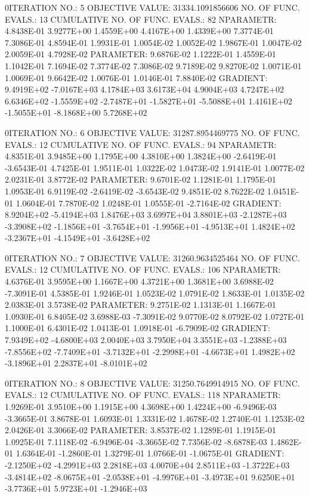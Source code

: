\documentclass[
  letterpaper,
  toc=chapterentrywithdots,
  listof=totoc,
  11pt,
  headings=small,
  usegeometry]{scrreprt}
\begin{document}
\begin{nonmemlisting}
0ITERATION NO.:    5    OBJECTIVE VALUE:   31334.1091856606        NO. OF FUNC. EVALS.:  13
 CUMULATIVE NO. OF FUNC. EVALS.:       82
 NPARAMETR:  4.8438E-01  3.9277E+00  1.4559E+00  4.4167E+00  1.4339E+00  7.3774E-01  7.3086E-01  4.8594E-01  1.9931E-01  1.0054E-02
             1.0052E-02  1.9867E-01  1.0047E-02  2.0059E-01  4.7928E-02
 PARAMETER:  9.6876E-02  1.1222E-01  1.4559E-01  1.1042E-01  7.1694E-02  7.3774E-02  7.3086E-02  9.7189E-02  9.8270E-02  1.0071E-01
             1.0069E-01  9.6642E-02  1.0076E-01  1.0146E-01  7.8840E-02
 GRADIENT:   9.4919E+02 -7.0167E+03  4.1784E+03  3.6173E+04  4.9004E+03  4.7247E+02  6.6346E+02 -1.5559E+02 -2.7487E+01 -1.5827E+01
            -5.5088E+01  1.4161E+02 -1.5055E+01 -8.1868E+00  5.7268E+02

0ITERATION NO.:    6    OBJECTIVE VALUE:   31287.8954469775        NO. OF FUNC. EVALS.:  12
 CUMULATIVE NO. OF FUNC. EVALS.:       94
 NPARAMETR:  4.8351E-01  3.9485E+00  1.1795E+00  4.3810E+00  1.3824E+00 -2.6419E-01 -3.6543E-01  4.7425E-01  1.9511E-01  1.0322E-02
             1.0473E-02  1.9141E-01  1.0077E-02  2.0231E-01  3.8772E-02
 PARAMETER:  9.6701E-02  1.1281E-01  1.1795E-01  1.0953E-01  6.9119E-02 -2.6419E-02 -3.6543E-02  9.4851E-02  8.7622E-02  1.0451E-01
             1.0604E-01  7.7870E-02  1.0248E-01  1.0555E-01 -2.7164E-02
 GRADIENT:   8.9204E+02 -5.4194E+03  1.8476E+03  3.6997E+04  3.8801E+03 -2.1287E+03 -3.3908E+02 -1.1856E+01 -3.7654E+01 -1.9956E+01
            -4.9513E+01  1.4824E+02 -3.2367E+01 -4.1549E+01 -3.6428E+02

0ITERATION NO.:    7    OBJECTIVE VALUE:   31260.9634525464        NO. OF FUNC. EVALS.:  12
 CUMULATIVE NO. OF FUNC. EVALS.:      106
 NPARAMETR:  4.6376E-01  3.9595E+00  1.1667E+00  4.3721E+00  1.3681E+00  3.6988E-02 -7.3091E-01  4.5385E-01  1.9246E-01  1.0523E-02
             1.0791E-02  1.8633E-01  1.0135E-02  2.0383E-01  3.5738E-02
 PARAMETER:  9.2751E-02  1.1313E-01  1.1667E-01  1.0930E-01  6.8405E-02  3.6988E-03 -7.3091E-02  9.0770E-02  8.0792E-02  1.0727E-01
             1.1000E-01  6.4301E-02  1.0413E-01  1.0918E-01 -6.7909E-02
 GRADIENT:   7.9349E+02 -4.6800E+03  2.0040E+03  3.7950E+04  3.3551E+03 -1.2388E+03 -7.8556E+02 -7.7409E+01 -3.7132E+01 -2.2998E+01
            -4.6673E+01  1.4982E+02 -3.1896E+01  2.2837E+01 -8.0101E+02

0ITERATION NO.:    8    OBJECTIVE VALUE:   31250.7649914915        NO. OF FUNC. EVALS.:  12
 CUMULATIVE NO. OF FUNC. EVALS.:      118
 NPARAMETR:  1.9269E-01  3.9510E+00  1.1915E+00  4.3698E+00  1.4224E+00 -6.9496E-03 -3.3665E-01  3.8678E-01  1.6093E-01  1.3331E-02
             1.4678E-02  1.2740E-01  1.1253E-02  2.0426E-01  3.3066E-02
 PARAMETER:  3.8537E-02  1.1289E-01  1.1915E-01  1.0925E-01  7.1118E-02 -6.9496E-04 -3.3665E-02  7.7356E-02 -8.6878E-03  1.4862E-01
             1.6364E-01 -1.2860E-01  1.3279E-01  1.0766E-01 -1.0675E-01
 GRADIENT:  -2.1250E+02 -4.2991E+03  2.2818E+03  4.0070E+04  2.8511E+03 -1.3722E+03 -3.4814E+02 -8.0675E+01 -2.0538E+01 -4.9976E+01
            -3.4973E+01  9.6250E+01 -3.7736E+01  5.9723E+01 -1.2946E+03


\end{nonmemlisting}
\end{document}
